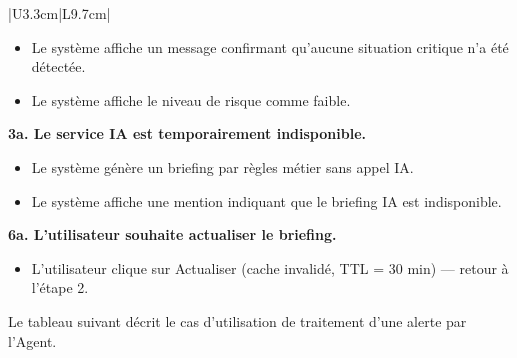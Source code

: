 \documentclass[a4paper,12pt]{report}
\begin{document}
\begin{longtable}{|U{3.3cm}|L{9.7cm}|}
\begin{itemize}
    \item[2.1] Le système affiche un message confirmant qu'aucune situation
               critique n'a été détectée.
    \item[2.2] Le système affiche le niveau de risque comme faible.
\end{itemize}
\textbf{3a. Le service IA est temporairement indisponible.}
\begin{itemize}
    \item[3.1] Le système génère un briefing par règles métier sans appel IA.
    \item[3.2] Le système affiche une mention indiquant que le briefing IA est indisponible.
\end{itemize}
\textbf{6a. L'utilisateur souhaite actualiser le briefing.}
\begin{itemize}
    \item[6.1] L'utilisateur clique sur Actualiser (cache invalidé, TTL = 30 min) --- retour à l'étape 2.
\end{itemize} 
\end{longtable}

Le tableau suivant décrit le cas d'utilisation
de traitement d'une alerte par l'Agent.
\end{document}
